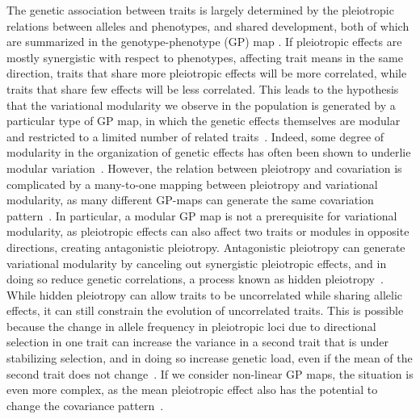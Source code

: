 \begin{refsection}
The genetic association between traits is largely determined by the
pleiotropic relations between alleles and phenotypes, and shared development,
both of which are summarized in the genotype-phenotype (GP) map . If
pleiotropic effects are mostly synergistic with respect to phenotypes,
affecting trait means in the same direction, traits that share more
pleiotropic effects will be more correlated, while traits that share few
effects will be less correlated. This leads to the hypothesis that the
variational modularity we observe in the population is generated by a
particular type of GP map, in which the genetic effects themselves are modular
and restricted to a limited number of related
traits~\parencite{Wagner1996-ui}. Indeed, some degree of modularity in the
organization of genetic effects has often been shown to underlie modular
variation~\parencite{Cheverud1997-rw, Mezey2000-rs, Kenney-Hunt2008-bd,
Porto2016-qc, Leamy1999-dm}. However, the relation between pleiotropy and
covariation is complicated by a many-to-one mapping between pleiotropy and
variational modularity, as many different GP-maps can generate the same
covariation pattern~\parencite{Mitteroecker2009-jb}. In particular, a modular
GP map is not a prerequisite for variational modularity, as pleiotropic
effects can also affect two traits or modules in opposite directions, creating
antagonistic pleiotropy. Antagonistic pleiotropy can generate variational
modularity by canceling out synergistic pleiotropic effects, and in doing so
reduce genetic correlations, a process known as hidden
pleiotropy~\parencite{Turelli1985-ne, Pavlicev2011-xm}. While hidden
pleiotropy can allow traits to be uncorrelated while sharing allelic effects,
it can still constrain the evolution of uncorrelated traits. This is possible
because the change in allele frequency in pleiotropic loci due to directional
selection in one trait can increase the variance in a second trait that is
under stabilizing selection, and in doing so increase genetic load, even if
the mean of the second trait does not change~\parencite{Baatz1997-hh}. If we
consider non-linear GP maps, the situation is even more complex, as the mean
pleiotropic effect also has the potential to change the covariance
pattern~\parencite{Mitteroecker2009-jb}.


\end{refsection}
